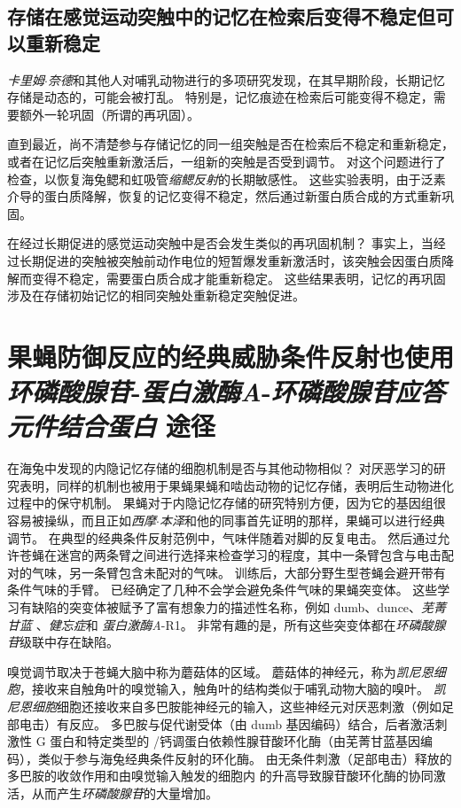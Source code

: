 \subsection{存储在感觉运动突触中的记忆在检索后变得不稳定但可以重新稳定}

\textit{卡里姆$\cdot$奈德}和其他人对哺乳动物进行的多项研究发现，在其早期阶段，长期记忆存储是动态的，可能会被打乱。
特别是，记忆痕迹在检索后可能变得不稳定，需要额外一轮巩固（所谓的再巩固）。


直到最近，尚不清楚参与存储记忆的同一组突触是否在检索后不稳定和重新稳定，或者在记忆后突触重新激活后，一组新的突触是否受到调节。
对这个问题进行了检查，以恢复海兔鳃和虹吸管\textit{缩鳃反射}的长期敏感性。
这些实验表明，由于泛素介导的蛋白质降解，恢复的记忆变得不稳定，然后通过新蛋白质合成的方式重新巩固。


在经过长期促进的感觉运动突触中是否会发生类似的再巩固机制？
事实上，当经过长期促进的突触被突触前动作电位的短暂爆发重新激活时，该突触会因蛋白质降解而变得不稳定，需要蛋白质合成才能重新稳定。
这些结果表明，记忆的再巩固涉及在存储初始记忆的相同突触处重新稳定突触促进。



\section{果蝇防御反应的经典威胁条件反射也使用 \textit{环磷酸腺苷}-\textit{蛋白激酶A}-\textit{环磷酸腺苷应答元件结合蛋白} 途径}

在海兔中发现的内隐记忆存储的细胞机制是否与其他动物相似？
对厌恶学习的研究表明，同样的机制也被用于果蝇果蝇和啮齿动物的记忆存储，表明后生动物进化过程中的保守机制。
果蝇对于内隐记忆存储的研究特别方便，因为它的基因组很容易被操纵，而且正如\textit{西摩$\cdot$本泽}和他的同事首先证明的那样，果蝇可以进行经典调节。
在典型的经典条件反射范例中，气味伴随着对脚的反复电击。
然后通过允许苍蝇在迷宫的两条臂之间进行选择来检查学习的程度，其中一条臂包含与电击配对的气味，另一条臂包含未配对的气味。
训练后，大部分野生型苍蝇会避开带有条件气味的手臂。
已经确定了几种不会学会避免条件气味的果蝇突变体。
这些学习有缺陷的突变体被赋予了富有想象力的描述性名称，例如 dumb、dunce、\textit{芜菁甘蓝
}、\textit{健忘症}和 \textit{蛋白激酶A}-R1。
非常有趣的是，所有这些突变体都在\textit{环磷酸腺苷}级联中存在缺陷。


嗅觉调节取决于苍蝇大脑中称为蘑菇体的区域。
蘑菇体的神经元，称为\textit{凯尼恩细胞}，接收来自触角叶的嗅觉输入，触角叶的结构类似于哺乳动物大脑的嗅叶。
\textit{凯尼恩细胞}细胞还接收来自多巴胺能神经元的输入，这些神经元对厌恶刺激（例如足部电击）有反应。
多巴胺与促代谢受体（由 dumb 基因编码）结合，后者激活刺激性 G 蛋白和特定类型的 /钙调蛋白依赖性腺苷酸环化酶（由芜菁甘蓝基因编码），类似于参与海兔经典条件反射的环化酶。
由无条件刺激（足部电击）释放的多巴胺的收敛作用和由嗅觉输入触发的细胞内  的升高导致腺苷酸环化酶的协同激活，从而产生\textit{环磷酸腺苷}的大量增加。


